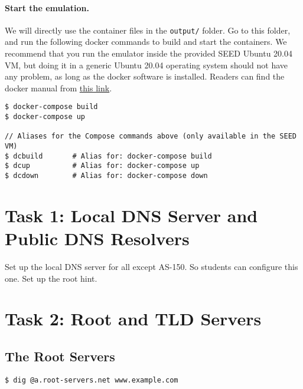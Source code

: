 \paragraph{Start the emulation.}
We will directly use the container files in the \texttt{output/} folder.
Go to this folder, and run the following docker commands
to build and start the containers. We recommend that you run the emulator inside
the provided SEED Ubuntu 20.04 VM, but doing it in a generic Ubuntu 20.04 operating system
should not have any problem, as long as the docker software is installed.
Readers can find the docker manual from
\href{https://github.com/seed-labs/seed-labs/blob/master/manuals/docker/SEEDManual-Container.md}
{\underline{this link}}.

\begin{lstlisting}
$ docker-compose build
$ docker-compose up

// Aliases for the Compose commands above (only available in the SEED VM)
$ dcbuild       # Alias for: docker-compose build
$ dcup          # Alias for: docker-compose up
$ dcdown        # Alias for: docker-compose down
\end{lstlisting}


\section{Task 1: Local DNS Server and Public DNS Resolvers} 

Set up the local DNS server for all except AS-150. So students
can configure this one.
Set up the root hint.




\section{Task 2: Root and TLD Servers} 


\subsection{The Root Servers} 



\begin{lstlisting}
$ dig @a.root-servers.net www.example.com
\end{lstlisting}
 




